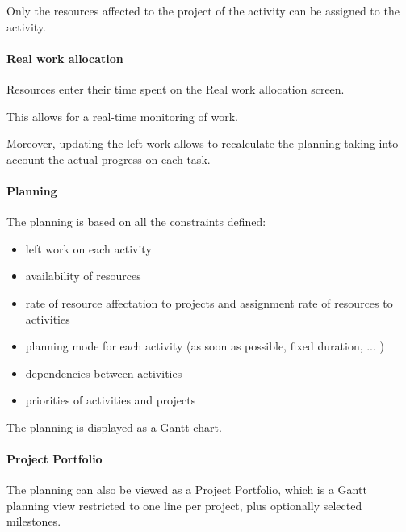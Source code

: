\documentclass[letterpaper,10pt,english]{sphinxmanual}
\begin{document}
Only the resources affected to the project of the activity can be assigned to the activity.

\paragraph{Real work allocation}

Resources enter their time spent on the Real work allocation screen.

This allows for a real-time monitoring of work.

Moreover, updating the left work allows to recalculate the planning taking into account the actual progress on each task.

\paragraph{Planning}

The planning is based on all the constraints defined:
\begin{itemize}
\item {} 
left work on each activity

\item {} 
availability of resources

\item {} 
rate of resource affectation to projects and assignment rate of resources to activities

\item {} 
planning mode for each activity (as soon as possible, fixed duration, ... )

\item {} 
dependencies between activities

\item {} 
priorities of activities and projects

\end{itemize}

The planning is displayed as a Gantt chart.

\paragraph{Project Portfolio}

The planning can also be viewed as a Project Portfolio, which is a Gantt planning view restricted to one line per project, plus optionally selected milestones.
\newpage
{}
\end{document}
